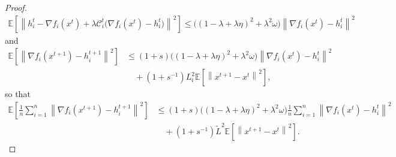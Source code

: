 \documentclass{article} %
\theoremstyle{plain}
\theoremstyle{definition}
\theoremstyle{remark}
\newcommand{\sqnorm}[1]{\left\| #1 \right\|^2}
\newcommand{\Exp}[1]{\mathbb{E}\!\left[ #1 \right]}
\begin{document}
\begin{proof}
   \begin{align*}
   \Exp{\sqnorm{h_i^{t}-\nabla f_i(x^{t}) +\lambda \mathcal{C}_i^t\big(\nabla f_i(x^t)-h_i^t\big)  }}\leq\big((1-\lambda+\lambda\eta)^2+\lambda^2\omega\big) \sqnorm{\nabla f_i(x^t)-h_i^t}
   \end{align*}
   and
   \begin{align*}
   \Exp{\sqnorm{\nabla f_i(x^{t+1})-h_i^{t+1}}}&\leq (1+s)\big((1-\lambda+\lambda\eta)^2+\lambda^2\omega\big) \sqnorm{\nabla f_i(x^{t})-h_i^{t}}\\
   &\quad+(1+s^{-1})L_i^2\Exp
   {\sqnorm{x^{t+1}-x^{t}}},
   \end{align*}
   so that
   \begin{align*}
   \Exp{\frac{1}{n}\sum_{i=1}^n \sqnorm{\nabla f_i(x^{t+1})-h_i^{t+1}}}&
   \leq (1+s)\big((1-\lambda+\lambda\eta)^2+\lambda^2\omega\big) \frac{1}{n}\sum_{i=1}^n \sqnorm{\nabla f_i(x^t)-h_i^{t}}\\
   &\quad+(1+s^{-1})\tilde{L}^2\Exp
   {\sqnorm{x^{t+1}-x^{t}}}.
   \end{align*}


\end{proof}
\end{document}
